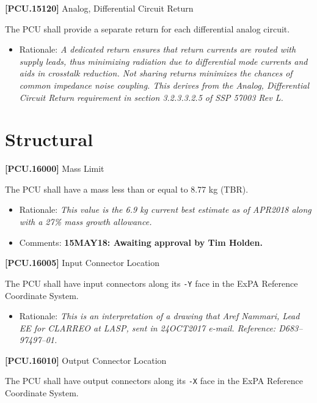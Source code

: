 \documentclass[12pt,oneside,oldfontcommands]{memoir}
\begin{document}
\textbf{[PCU.15120]} Analog, Differential Circuit Return

The \gls{PCU} shall provide a separate return for each differential analog circuit.

\begin{itemize}
\item{} Rationale: \emph{A dedicated return ensures that return currents are routed with supply leads, thus minimizing radiation due to differential mode currents and aids in crosstalk reduction. Not sharing returns minimizes the chances of common impedance noise coupling. This derives from the Analog, Differential Circuit Return requirement in section 3.2.3.3.2.5 of SSP 57003 Rev L.}

\end{itemize}

\section{Structural}
\label{structural}

\textbf{[PCU.16000]} Mass Limit

The \gls{PCU} shall have a mass less than or equal to 8.77 kg (TBR\label{tbx_11}).

\begin{itemize}
\item{} Rationale: \emph{This value is the 6.9 kg current best estimate as of APR2018 along with a 27\% mass growth allowance.}

\item{} Comments: \textbf{15MAY18: Awaiting approval by Tim Holden.}

\end{itemize}

\textbf{[PCU.16005]} Input Connector Location

The \gls{PCU} shall have input connectors along its \texttt{-Y} face in the \gls{ExPA} Reference Coordinate System.

\begin{itemize}
\item{} Rationale: \emph{This is an interpretation of a drawing that Aref Nammari, Lead EE for CLARREO at LASP, sent in 24OCT2017 e-mail. Reference: D683--97497--01.}

\end{itemize}

\textbf{[PCU.16010]} Output Connector Location

The \gls{PCU} shall have output connectors along its \texttt{-X} face in the \gls{ExPA} Reference Coordinate System.
\end{document}
